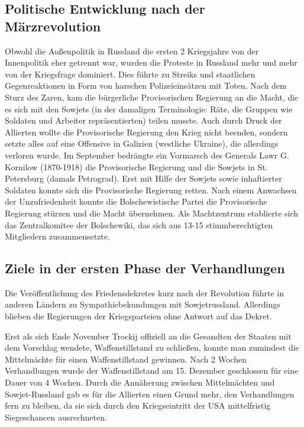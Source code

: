 \documentclass{../../sem_paper}
\begin{document}

\subsection{Politische Entwicklung nach der Märzrevolution}
Obwohl die Außenpolitik in Russland die ersten 2 Kriegsjahre von der Innenpolitik eher getrennt war, wurden die Proteste in Russland mehr und mehr von der Kriegsfrage dominiert. Dies führte zu Streiks und staatlichen Gegenreaktionen in Form von harschen Polizeieinsätzen mit Toten. Nach dem Sturz des Zaren, kam  die bürgerliche Provisorischen Regierung an die Macht, die es sich mit den Sowjets (in der damaligen Terminologie: Räte, die Gruppen wie Soldaten und Arbeiter  repräsentierten) teilen musste. Auch durch Druck der Allierten wollte die Provisorische Regierung den Krieg nicht beenden, sondern setzte alles auf eine Offensive in Galizien (westliche Ukraine), die allerdings verloren wurde. Im September bedrängte ein Vormarsch des Generals Lawr G. Kornilow (1870-1918) die Provisorische Regierung und die Sowjets in St. Petersburg (damals Petrograd). Erst mit Hilfe der Sowjets sowie inhaftierter Soldaten konnte sich die Provisorische Regierung retten. Nach einem Anwachsen der Unzufriedenheit konnte die Bolschewistische Partei die Provisorische Regierung stürzen und die Macht übernehmen. Als Machtzentrum etablierte sich das Zentralkomitee der Bolschewiki, das sich aus 13-15 stimmberechtigten Mitgliedern zusammensetzte.

\subsection{Ziele in der ersten Phase der Verhandlungen}
Die Veröffentlichung des Friedensdekretes kurz nach der Revolution führte in anderen Ländern zu Sympathiebekundungen mit Sowjetrussland. Allerdings blieben die Regierungen der Kriegsparteien  ohne Antwort auf das Dekret. 

Erst als sich Ende November Trockij offiziell an die Gesandten der Staaten mit dem Vorschlag wendete, Waffenstillstand zu schließen, konnte man zumindest die Mittelmächte für einen Waffenstillstand gewinnen. Nach 2 Wochen Verhandlungen wurde der Waffenstillstand am 15. Dezember geschlossen für eine Dauer von 4 Wochen. Durch die Annäherung zwischen Mittelmächten und Sowjet-Russland gab es für die Allierten einen Grund mehr, den Verhandlungen fern zu bleiben, da sie sich durch den Kriegseintritt der USA mittelfristig Siegeschancen ausrechneten.
\end{document}
